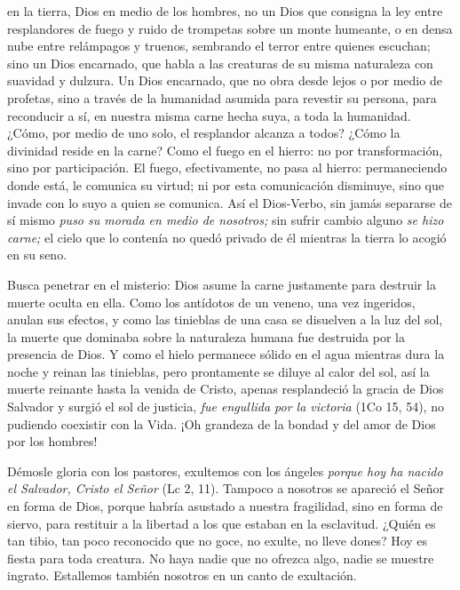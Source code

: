 \begin{body}
	 en la tierra, Dios en medio de los hombres, no un Dios que consigna la ley entre resplandores de fuego y ruido de trompetas sobre un monte humeante, o en densa nube entre relámpagos y truenos, sembrando el terror entre quienes escuchan; sino un Dios encarnado, que habla a las creaturas de su misma naturaleza con suavidad y dulzura. Un Dios encarnado, que no obra desde lejos o por medio de profetas, sino a través de la humanidad asumida para revestir su persona, para reconducir a sí, en nuestra misma carne hecha suya, a toda la humanidad. ¿Cómo, por medio de uno solo, el resplandor alcanza a todos? ¿Cómo la divinidad reside en la carne? Como el fuego en el hierro: no por transformación, sino por participación. El fuego, efectivamente, no pasa al hierro: permaneciendo donde está, le comunica su virtud; ni por esta comunicación disminuye, sino que invade con lo suyo a quien se comunica. Así el Dios-Verbo, sin jamás separarse de sí mismo \emph{puso su morada en medio de nosotros;} sin sufrir cambio alguno \emph{se hizo carne;} el cielo que lo contenía no quedó privado de él mientras la tierra lo acogió en su seno.
	
	Busca penetrar en el misterio: Dios asume la carne justamente para destruir la muerte oculta en ella. Como los antídotos de un veneno, una vez ingeridos, anulan sus efectos, y como las tinieblas de una casa se disuelven a la luz del sol, la muerte que dominaba sobre la naturaleza humana fue destruida por la presencia de Dios. Y como el hielo permanece sólido en el agua mientras dura la noche y reinan las tinieblas, pero prontamente se diluye al calor del sol, así la muerte reinante hasta la venida de Cristo, apenas resplandeció la gracia de Dios Salvador y surgió el sol de justicia, \emph{fue engullida por la victoria} (1Co 15, 54), no pudiendo coexistir con la Vida. ¡Oh grandeza de la bondad y del amor de Dios por los hombres!
	
	Démosle gloria con los pastores, exultemos con los ángeles \emph{porque hoy ha nacido el Salvador, Cristo el Señor} (Lc 2, 11). Tampoco a nosotros se apareció el Señor en forma de Dios, porque habría asustado a nuestra fragilidad, sino en forma de siervo, para restituir a la libertad a los que estaban en la esclavitud. ¿Quién es tan tibio, tan poco reconocido que no goce, no exulte, no lleve dones? Hoy es fiesta para toda creatura. No haya nadie que no ofrezca algo, nadie se muestre ingrato. Estallemos también nosotros en un canto de exultación.
\end{body}

